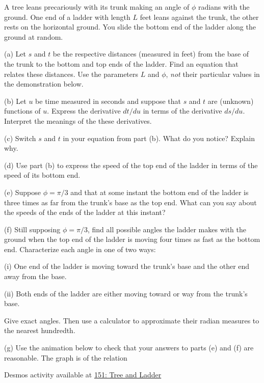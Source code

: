 \documentclass{ximera}
\begin{document}



\begin{question}  \label{QMMnd6793}
A tree leans precariously with its trunk making an angle of $\phi$ radians with the ground. One end of a ladder with length $L$ feet leans against the trunk, the other rests on the horizontal ground. You slide the bottom end of the ladder along the ground at random.

(a) Let $s$ and $t$ be the respective distances (measured in feet) from the base of the trunk to the bottom and top ends of the ladder. Find an equation that relates these distances. Use the parameters $L$ and $\phi$, \emph{not} their particular values in the demonstration below.

(b) Let $u$ be time measured in seconds and suppose that $s$ and $t$ are (unknown) functions of $u$. Express the derivative $dt/du$ in terms of the derivative $ds/du$. Interpret the meanings of the these derivatives.

(c) Switch $s$ and $t$ in your equation from part (b). What do you notice? Explain why.

(d) Use part (b) to express the speed of the top end of the ladder in terms of the speed of its bottom end.

(e) Suppose $\phi=\pi/3$ and that at some instant the bottom end of the ladder is three times as far from the trunk's base as the top end. What can you say about the speeds of the ends of the ladder at this instant? 

(f) Still supposing $\phi=\pi/3$, find all possible angles the ladder makes with the ground when the top end of the ladder is moving four times as fast as the bottom end. Characterize each angle in one of two ways:

(i) One end of the ladder is moving toward the trunk's base and the other end away from the base.

(ii) Both ends of the ladder are either moving toward or way from the trunk's base.

Give exact angles. Then use a calculator to approximate their radian measures to the nearest hundredth.

(g) Use the animation below to check that your answers to parts (e) and (f) are reasonable. The graph is of the relation


\begin{onlineOnly}
    \begin{center}
\end{center}
\end{onlineOnly}

Desmos activity available at \href{https://www.desmos.com/calculator/58jqjo0inl}{151: Tree and Ladder}

\end{question}
\end{document}
